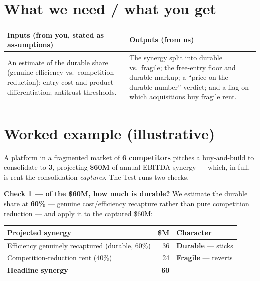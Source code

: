 \documentclass[11pt]{article}
\newcommand{\durable}{\textcolor{creoaccent}{\textbf{Durable}}}
\newcommand{\fragile}{\textcolor{gray!55!black}{\textbf{Fragile}}}
\begin{document}
\section{What we need / what you get}
\begin{center}
\renewcommand{\arraystretch}{1.25}\small
\begin{tabular}{p{6.6cm} p{6.6cm}}
\toprule
\textbf{Inputs (from you, stated as assumptions)} & \textbf{Outputs (from us)} \\
\midrule
An estimate of the durable share (genuine efficiency vs.\ competition reduction); entry cost and
product differentiation; antitrust thresholds. &
The synergy split into durable vs.\ fragile; the free-entry floor and durable markup; a
``price-on-the-durable-number'' verdict; and a flag on which acquisitions buy fragile rent. \\
\bottomrule
\end{tabular}
\end{center}

\section{Worked example (illustrative)}
A platform in a fragmented market of \textbf{6 competitors} pitches a buy-and-build to
consolidate to \textbf{3}, projecting \textbf{\$60M} of annual EBITDA synergy --- which, in full,
is rent the consolidation \emph{captures}. The Test runs two checks.

\smallskip
\textbf{Check 1 --- of the \$60M, how much is durable?} We estimate the durable share at
\textbf{60\%} --- genuine cost/efficiency recapture rather than pure competition reduction --- and
apply it to the captured \$60M:
\begin{center}
\renewcommand{\arraystretch}{1.25}\small
\begin{tabular}{l r l}
\toprule
\textbf{Projected synergy} & \textbf{\$M} & \textbf{Character} \\
\midrule
Efficiency genuinely recaptured (durable, 60\%) & 36 & \durable{} --- sticks \\
Competition-reduction rent (40\%)               & 24 & \fragile{} --- reverts \\
\midrule
\textbf{Headline synergy} & \textbf{60} & \\
\bottomrule
\end{tabular}
\end{center}
\end{document}
